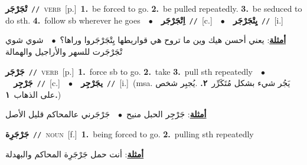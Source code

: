 \documentclass[10pt,a4paper,twoside]{article} %
\begin{document}
\begin{multicols}{2}
{\setlength\topsep{0pt}\textbf{\foreignlanguage{arabic}{تْجَرْجَر}}\ {\color{gray}\texttt{//}\color{black}}\ \textsc{verb}\ [p.]\ \textbf{1.}~be forced to go.  \textbf{2.}~be pulled repeatedly.  \textbf{3.}~be seduced to do sth.  \textbf{4.}~follow sb wherever he goes\ \ $\bullet$\ \ \setlength\topsep{0pt}\textbf{\foreignlanguage{arabic}{اِتْجَرْجَر}}\ {\color{gray}\texttt{//}\color{black}}\ [c.]\ \ $\bullet$\ \ \setlength\topsep{0pt}\textbf{\foreignlanguage{arabic}{يِتْجَرْجَر}}\ {\color{gray}\texttt{//}\color{black}}\ [i.]\  \begin{flushright}\color{gray}\foreignlanguage{arabic}{\textbf{\underline{\foreignlanguage{arabic}{أمثلة}}}: يعني أحسن هيك وين ما تروح هي قواريطها يِتْجَرْجَروا وراها؟\ $\bullet$\ \  شوي شوي تْجَرْجَرت للسهر والأراجيل والهمالة}\end{flushright}\color{black}} \vspace{2mm}

{\setlength\topsep{0pt}\textbf{\foreignlanguage{arabic}{جَرْجَر}}\ {\color{gray}\texttt{//}\color{black}}\ \textsc{verb}\ [p.]\ \textbf{1.}~force sb to go.  \textbf{2.}~take  \textbf{3.}~pull sth repeatedly\ \ $\bullet$\ \ \setlength\topsep{0pt}\textbf{\foreignlanguage{arabic}{جَرْجِر}}\ {\color{gray}\texttt{//}\color{black}}\ [c.]\ \ $\bullet$\ \ \setlength\topsep{0pt}\textbf{\foreignlanguage{arabic}{يجَرْجِر}}\ {\color{gray}\texttt{//}\color{black}}\ [i.]\ \color{gray}(msa. \foreignlanguage{arabic}{يَجُر شيء بشكل مُتَكَرِّر}~\foreignlanguage{arabic}{\textbf{٢.}}  .\foreignlanguage{arabic}{يُجبِر شخص على الذهاب}~\foreignlanguage{arabic}{\textbf{١.}})\color{black}\  \begin{flushright}\color{gray}\foreignlanguage{arabic}{\textbf{\underline{\foreignlanguage{arabic}{أمثلة}}}: جَرْجِر الحبل منيح\ $\bullet$\ \  جَرْجَرني عالمحاكم قليل الأصل}\end{flushright}\color{black}} \vspace{2mm}

{\setlength\topsep{0pt}\textbf{\foreignlanguage{arabic}{جَرْجَرِة}}\ {\color{gray}\texttt{//}\color{black}}\ \textsc{noun}\ [f.]\ \textbf{1.}~being forced to go.  \textbf{2.}~pulling sth repeatedly\  \begin{flushright}\color{gray}\foreignlanguage{arabic}{\textbf{\underline{\foreignlanguage{arabic}{أمثلة}}}: أنت حمل جَرْجَرِة المحاكم والبهدلة}\end{flushright}\color{black}} \vspace{2mm}


\end{multicols}
\end{document}
